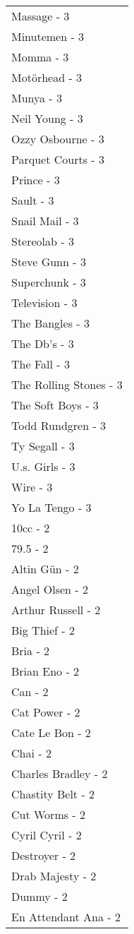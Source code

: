 \documentclass[
]{article}
\begin{document}
\begin{longtable}{l}
Massage - 3 \\ 
Minutemen - 3 \\ 
Momma - 3 \\ 
Motörhead - 3 \\ 
Munya - 3 \\ 
Neil Young - 3 \\ 
Ozzy Osbourne - 3 \\ 
Parquet Courts - 3 \\ 
Prince - 3 \\ 
Sault - 3 \\ 
Snail Mail - 3 \\ 
Stereolab - 3 \\ 
Steve Gunn - 3 \\ 
Superchunk - 3 \\ 
Television - 3 \\ 
The Bangles - 3 \\ 
The Db's - 3 \\ 
The Fall - 3 \\ 
The Rolling Stones - 3 \\ 
The Soft Boys - 3 \\ 
Todd Rundgren - 3 \\ 
Ty Segall - 3 \\ 
U.s. Girls - 3 \\ 
Wire - 3 \\ 
Yo La Tengo - 3 \\ 
10cc - 2 \\ 
79.5 - 2 \\ 
Altin Gün - 2 \\ 
Angel Olsen - 2 \\ 
Arthur Russell - 2 \\ 
Big Thief - 2 \\ 
Bria - 2 \\ 
Brian Eno - 2 \\ 
Can - 2 \\ 
Cat Power - 2 \\ 
Cate Le Bon - 2 \\ 
Chai - 2 \\ 
Charles Bradley - 2 \\ 
Chastity Belt - 2 \\ 
Cut Worms - 2 \\ 
Cyril Cyril - 2 \\ 
Destroyer - 2 \\ 
Drab Majesty - 2 \\ 
Dummy - 2 \\ 
En Attendant Ana - 2 \\ 

\end{longtable}
\end{document}
